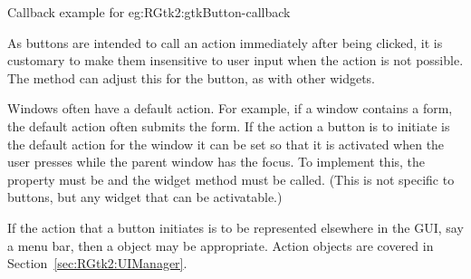 \begin{example}{Callback example for
    }{eg:RGtk2:gtkButton-callback}

\begin{Schunk}
\end{Schunk}
\end{example}

As buttons are intended to call an action immediately after being
clicked, it is customary to make them insensitive to user input when
the action is not possible. The 
method can adjust this for the button, as with other widgets.

Windows often have a default action. For example, if a window contains
a form, the default action often submits the form. If the action a
button is to initiate is the default action for the window it can be
set so that it is activated when the user presses  while
the parent window has the focus. To implement this, the property
 must be  and the widget method
 must be called. (This is not specific
to buttons, but any widget that can be activatable.)

If the action that a button initiates is to be represented elsewhere
in the GUI, say a menu bar, then a  object may be
appropriate. Action objects are covered in
Section~\ref{sec:RGtk2:UIManager}.

